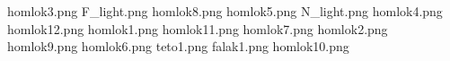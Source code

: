 homlok3.png
F_light.png
homlok8.png
homlok5.png
N_light.png
homlok4.png
homlok12.png
homlok1.png
homlok11.png
homlok7.png
homlok2.png
homlok9.png
homlok6.png
teto1.png
falak1.png
homlok10.png
